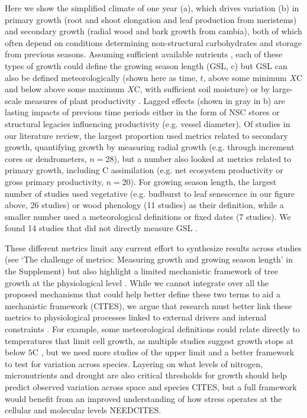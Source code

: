 \documentclass[11pt]{article}
\newcommand{\R}[1]{\label{#1}\linelabel{#1}}
\begin{document}
Here we show the simplified climate of one year (a), which drives variation (b) in primary growth (root and shoot elongation and leaf production from meristems) and secondary growth (radial wood and bark growth from cambia), both of which often depend on conditions determining non-structural carbohydrates \citep[NSC, which are sugars and starch needed for growth and an important area of study, for more details see][]{hartmann2016understanding,martinez2016dynamics,tixier2020comparison,luo2024internal} and storage from previous seasons. \R{forbigKNUTS1}Assuming sufficient available nutrients \citep{korner2015paradigm}, each of these types of growth could define the growing season length (GSL, c) but GSL can also be defined meteorologically (shown here as time, $t$, above some minimum $X$\degree C and below above some maximum $X$\degree C, with sufficient soil moisture) or by large-scale measures of plant productivity \citep{korner2023four}. Lagged effects (shown in gray in b) are lasting impacts of previous time periods either in the form of NSC stores or structural legacies influencing productivity (e.g. vessel diameter). Of studies in our literature review, the largest proportion used metrics related to secondary growth, quantifying growth by measuring radial growth (e.g. through increment cores or dendrometers, $n=$28), but a number also looked at metrics related to primary growth, including C assimilation (e.g. net ecosystem productivity or gross primary productivity, $n=$20). For growing season length, the largest number of studies used vegetative (e.g. budburst to leaf senescence in our figure above, 26 studies) or wood phenology (11 studies) as their definition, while a smaller number used a meteorological definitions or fixed dates (7 studies). We found 14 studies that did not directly measure GSL \citep[e.g.][]{zhu2021different,dow2022warm,zohner2023effect}. 

These different metrics limit any current effort to synthesize results across studies (see `The challenge of metrics: Measuring growth and growing season length' in the Supplement) but also highlight a limited mechanistic framework of tree growth at the physiological level \citep{korner2021tools,manzanedo2024moving}. While we cannot integrate over all the proposed mechanisms that could help better define these two terms to aid a mechanistic framework (CITES), we argue that research must better link these metrics to physiological processes linked to external drivers and internal constraints \citep{vieira2020tree}. For example, some meteorological definitions could relate directly to temperatures that limit cell growth, as multiple studies suggest growth stops at below $5$\degree C \citep{korner1998re,rossi2008critical}, but we need more studies of the upper limit and a better framework to test for variation across species. \R{forbigKNUTS2}Layering on what levels of nitrogen, micronutrients and drought are also critical thresholds for growth \citep{korner2022forest,el2022accumulation,fu2019nutrient} should help predict observed variation across space and species CITES, but a full framework would benefit from an improved understanding of how stress operates at the cellular and molecular levels NEEDCITES. 
\end{document}
